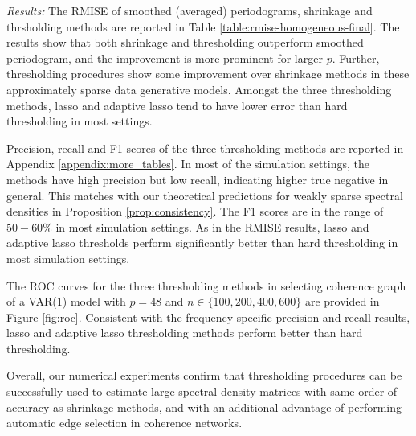 \textit{Results: } The RMISE of smoothed (averaged) periodograms, shrinkage and thrsholding methods are reported in Table \ref{table:rmise-homogeneous-final}. The results show that both shrinkage and thresholding outperform smoothed periodogram, and the improvement is more prominent for larger $p$. Further, thresholding procedures show some improvement over shrinkage methods in these approximately sparse data generative models. Amongst the three thresholding methods,  lasso and adaptive lasso tend to have lower error than hard thresholding in most settings. 

Precision, recall and F1 scores of the three thresholding methods are reported 
in Appendix \ref{appendix:more_tables}. In most of the simulation settings, the methods have high precision but low recall, indicating higher true negative in general. This matches with our theoretical predictions for weakly sparse spectral densities in Proposition \ref{prop:consistency}. The F1 scores are in the range of $50-60\%$ in most simulation settings. As in the RMISE results, lasso and adaptive lasso thresholds perform significantly better than hard thresholding in most simulation settings.



The ROC curves for the three thresholding methods in selecting coherence graph of a VAR(1) model with $p=48$ and $n \in \{100, 200, 400, 600\}$ are provided in Figure \ref{fig:roc}. Consistent with the frequency-specific precision and recall results, lasso and adaptive lasso thresholding methods perform better than hard thresholding. 

Overall, our numerical experiments confirm that thresholding procedures can be successfully used to estimate large spectral density matrices with same order of accuracy as shrinkage methods, and with an additional advantage of performing automatic edge selection in coherence networks.  





